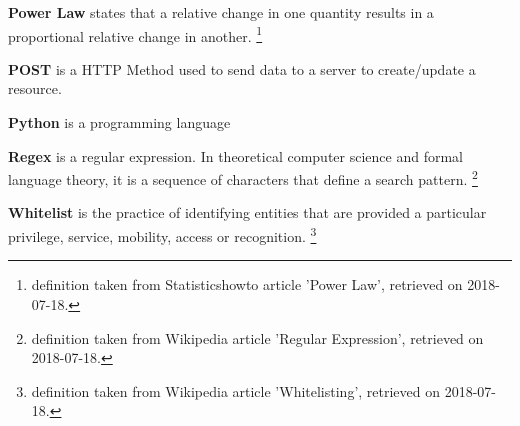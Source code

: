 \noindent \textbf{Power Law} states that a relative change in one quantity results in a proportional relative change in another. \footnote{definition taken from Statisticshowto article 'Power Law', retrieved on 2018-07-18.}

\noindent \textbf{POST} is a HTTP Method used to send data to a server to create/update a resource. 

\noindent \textbf{Python} is a programming language

\noindent \textbf{Regex} is a regular expression. In theoretical computer science and formal language theory, it is a sequence of characters that define a search pattern. \footnote{definition taken from Wikipedia article 'Regular Expression', retrieved on 2018-07-18.}

\noindent \textbf{Whitelist} is the practice of identifying entities that are provided a particular privilege, service, mobility, access or recognition. \footnote{definition taken from Wikipedia article 'Whitelisting', retrieved on 2018-07-18.}
